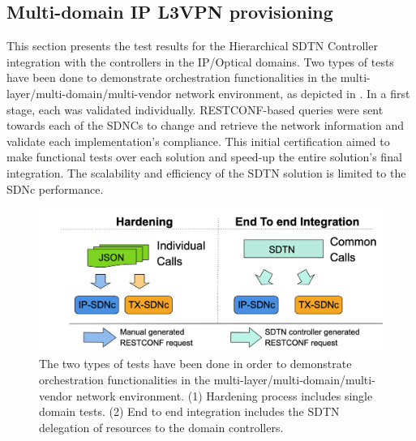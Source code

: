 \documentclass[10pt, conference]{IEEEtran}
\begin{document}


\subsection{Multi-domain IP L3VPN provisioning}

This section presents the test results for the Hierarchical SDTN Controller integration with the controllers in the IP/Optical domains. Two types of tests have been done to demonstrate orchestration functionalities in the multi-layer/multi-domain/multi-vendor network environment, as depicted in . In a first stage, each  was validated individually. RESTCONF-based queries were sent towards each of the SDNCs to change and retrieve the network information and validate each implementation's compliance. This initial certification aimed to make functional tests over each solution and speed-up the entire solution's final integration. The scalability and efficiency of the SDTN  solution is limited to the SDNc performance.

\begin{figure}
	\centering
		\includegraphics[width=\linewidth]{figs/diagram-11.png}
	\caption{The two types of tests have been done in order to demonstrate orchestration functionalities in the multi-layer/multi-domain/multi-vendor network environment. (1) Hardening process includes single domain tests. (2) End to end integration includes the SDTN  delegation of resources to the domain controllers.}
	\label{FIG:testing_workflow}
\end{figure}
\end{document}
